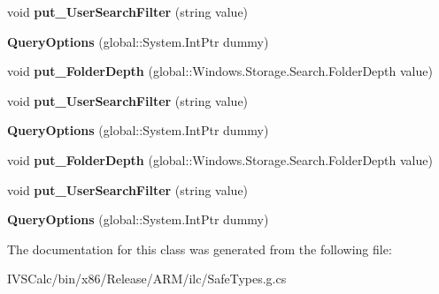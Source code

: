 \begin{DoxyCompactItemize}
\item 
\mbox{\label{class_windows_1_1_storage_1_1_search_1_1_query_options_a7f301369c52cdaf3a276f6c42cf13ae0}} 
void {\bfseries put\+\_\+\+User\+Search\+Filter} (string value)
\item 
\mbox{\label{class_windows_1_1_storage_1_1_search_1_1_query_options_a6a7f9860a657c7d34fbb7ab2c0192147}} 
{\bfseries Query\+Options} (global\+::\+System.\+Int\+Ptr dummy)
\item 
\mbox{\label{class_windows_1_1_storage_1_1_search_1_1_query_options_ab7684034a5a2464b47e93cc3a2c6fa99}} 
void {\bfseries put\+\_\+\+Folder\+Depth} (global\+::\+Windows.\+Storage.\+Search.\+Folder\+Depth value)
\item 
\mbox{\label{class_windows_1_1_storage_1_1_search_1_1_query_options_a7f301369c52cdaf3a276f6c42cf13ae0}} 
void {\bfseries put\+\_\+\+User\+Search\+Filter} (string value)
\item 
\mbox{\label{class_windows_1_1_storage_1_1_search_1_1_query_options_a6a7f9860a657c7d34fbb7ab2c0192147}} 
{\bfseries Query\+Options} (global\+::\+System.\+Int\+Ptr dummy)
\item 
\mbox{\label{class_windows_1_1_storage_1_1_search_1_1_query_options_ab7684034a5a2464b47e93cc3a2c6fa99}} 
void {\bfseries put\+\_\+\+Folder\+Depth} (global\+::\+Windows.\+Storage.\+Search.\+Folder\+Depth value)
\item 
\mbox{\label{class_windows_1_1_storage_1_1_search_1_1_query_options_a7f301369c52cdaf3a276f6c42cf13ae0}} 
void {\bfseries put\+\_\+\+User\+Search\+Filter} (string value)
\item 
\mbox{\label{class_windows_1_1_storage_1_1_search_1_1_query_options_a6a7f9860a657c7d34fbb7ab2c0192147}} 
{\bfseries Query\+Options} (global\+::\+System.\+Int\+Ptr dummy)
\end{DoxyCompactItemize}


The documentation for this class was generated from the following file\+:\begin{DoxyCompactItemize}
\item 
I\+V\+S\+Calc/bin/x86/\+Release/\+A\+R\+M/ilc/Safe\+Types.\+g.\+cs\end{DoxyCompactItemize}
